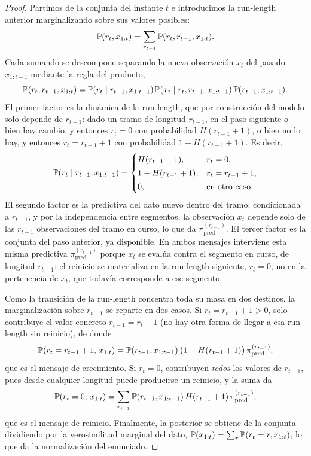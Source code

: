 \begin{proof}
Partimos de la conjunta del instante $t$ e introducimos la run-length anterior marginalizando sobre sus valores posibles:
\[
\mathbb{P}(r_t, x_{1:t}) = \sum_{r_{t-1}} \mathbb{P}(r_t, r_{t-1}, x_{1:t}).
\]
Cada sumando se descompone separando la nueva observación $x_t$ del pasado $x_{1:t-1}$ mediante la regla del producto,
\[
\mathbb{P}(r_t, r_{t-1}, x_{1:t})
= \mathbb{P}(r_t \mid r_{t-1}, x_{1:t-1})\,
  \mathbb{P}(x_t \mid r_t, r_{t-1}, x_{1:t-1})\,
  \mathbb{P}(r_{t-1}, x_{1:t-1}).
\]
El primer factor es la dinámica de la run-length, que por construcción del modelo solo depende de $r_{t-1}$: dado un tramo de longitud $r_{t-1}$, en el paso siguiente o bien hay cambio, y entonces $r_t = 0$ con probabilidad $H(r_{t-1}+1)$, o bien no lo hay, y entonces $r_t = r_{t-1}+1$ con probabilidad $1 - H(r_{t-1}+1)$. Es decir,
\[
\mathbb{P}(r_t \mid r_{t-1}, x_{1:t-1}) =
\begin{cases}
H(r_{t-1}+1), & r_t = 0,\\[2pt]
1 - H(r_{t-1}+1), & r_t = r_{t-1}+1,\\[2pt]
0, & \text{en otro caso.}
\end{cases}
\]
El segundo factor es la predictiva del dato nuevo dentro del tramo: condicionada a $r_{t-1}$, y por la independencia entre segmentos, la observación $x_t$ depende solo de las $r_{t-1}$ observaciones del tramo en curso, lo que da $\pi^{(r_{t-1})}_{\mathrm{pred}}$. El tercer factor es la conjunta del paso anterior, ya disponible. En ambos mensajes interviene esta misma predictiva $\pi^{(r_{t-1})}_{\mathrm{pred}}$ porque $x_t$ se evalúa contra el segmento en curso, de longitud $r_{t-1}$: el reinicio se materializa en la run-length siguiente, $r_t = 0$, no en la pertenencia de $x_t$, que todavía corresponde a ese segmento.

Como la transición de la run-length concentra toda su masa en dos destinos, la marginalización sobre $r_{t-1}$ se reparte en dos casos. Si $r_t = r_{t-1} + 1 > 0$, solo contribuye el valor concreto $r_{t-1} = r_t - 1$ (no hay otra forma de llegar a esa run-length sin reinicio), de donde
\[
\mathbb{P}(r_t = r_{t-1}+1,\, x_{1:t})
= \mathbb{P}(r_{t-1}, x_{1:t-1})\,\big(1 - H(r_{t-1}+1)\big)\,\pi^{(r_{t-1})}_{\mathrm{pred}},
\]
que es el mensaje de crecimiento. Si $r_t = 0$, contribuyen \emph{todos} los valores de $r_{t-1}$, pues desde cualquier longitud puede producirse un reinicio, y la suma da
\[
\mathbb{P}(r_t = 0,\, x_{1:t})
= \sum_{r_{t-1}} \mathbb{P}(r_{t-1}, x_{1:t-1})\, H(r_{t-1}+1)\, \pi^{(r_{t-1})}_{\mathrm{pred}},
\]
que es el mensaje de reinicio. Finalmente, la posterior se obtiene de la conjunta dividiendo por la verosimilitud marginal del dato, $\mathbb{P}(x_{1:t}) = \sum_{r}\mathbb{P}(r_t = r, x_{1:t})$, lo que da la normalización del enunciado.
\end{proof}


